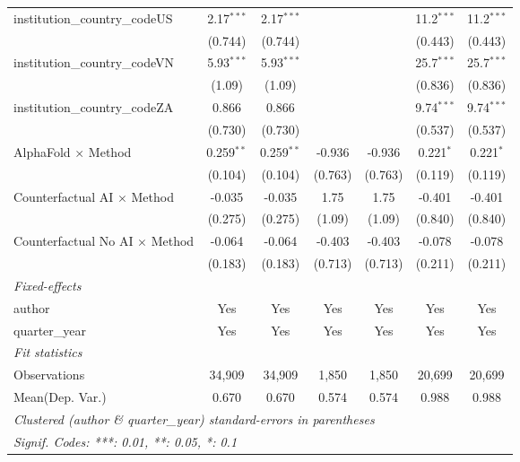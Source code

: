 \begin{tabular}{lcccccc}
   institution\_country\_codeUS          & 2.17$^{***}$   & 2.17$^{***}$   &               &               & 11.2$^{***}$  & 11.2$^{***}$\\   
                                         & (0.744)        & (0.744)        &               &               & (0.443)       & (0.443)\\   
   institution\_country\_codeVN          & 5.93$^{***}$   & 5.93$^{***}$   &               &               & 25.7$^{***}$  & 25.7$^{***}$\\   
                                         & (1.09)         & (1.09)         &               &               & (0.836)       & (0.836)\\   
   institution\_country\_codeZA          & 0.866          & 0.866          &               &               & 9.74$^{***}$  & 9.74$^{***}$\\   
                                         & (0.730)        & (0.730)        &               &               & (0.537)       & (0.537)\\   
   AlphaFold $\times$ Method             & 0.259$^{**}$   & 0.259$^{**}$   & -0.936        & -0.936        & 0.221$^{*}$   & 0.221$^{*}$\\   
                                         & (0.104)        & (0.104)        & (0.763)       & (0.763)       & (0.119)       & (0.119)\\   
   Counterfactual AI $\times$ Method     & -0.035         & -0.035         & 1.75          & 1.75          & -0.401        & -0.401\\   
                                         & (0.275)        & (0.275)        & (1.09)        & (1.09)        & (0.840)       & (0.840)\\   
   Counterfactual No AI $\times$ Method  & -0.064         & -0.064         & -0.403        & -0.403        & -0.078        & -0.078\\   
                                         & (0.183)        & (0.183)        & (0.713)       & (0.713)       & (0.211)       & (0.211)\\   
   \midrule
   \emph{Fixed-effects}\\
   author                                & Yes            & Yes            & Yes           & Yes           & Yes           & Yes\\  
   quarter\_year                         & Yes            & Yes            & Yes           & Yes           & Yes           & Yes\\  
   \midrule
   \emph{Fit statistics}\\
   Observations                          & 34,909         & 34,909         & 1,850         & 1,850         & 20,699        & 20,699\\  
Mean(Dep. Var.) & 0.670 & 0.670 & 0.574 & 0.574 & 0.988 & 0.988 \\
   \midrule \midrule
   \multicolumn{7}{l}{\emph{Clustered (author \& quarter\_year) standard-errors in parentheses}}\\
   \multicolumn{7}{l}{\emph{Signif. Codes: ***: 0.01, **: 0.05, *: 0.1}}\\
\end{tabular}
\par\endgroup
